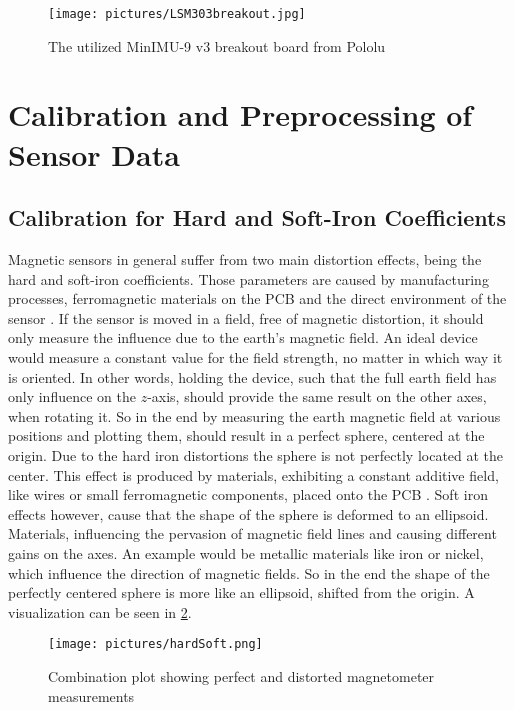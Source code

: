 \begin{figure}
\centering
\texttt{[image: pictures/LSM303breakout.jpg]}
\caption{The utilized MinIMU-9 v3 breakout board from Pololu \cite{pol2016}}
\label{fig:breakout}
\end{figure}


\section{Calibration and Preprocessing of Sensor Data} \label{sec:caliPrepro}

\subsection{Calibration for Hard and Soft-Iron Coefficients} \label{subsec:hardSoft}

Magnetic sensors in general suffer from two main distortion effects, being the hard and soft-iron coefficients. Those parameters are caused by manufacturing processes, ferromagnetic materials on the \ac{PCB} and the direct environment of the sensor \cite{ozyagcilar2012calibrating}. If the sensor is moved in a field, free of magnetic distortion, it should only measure the influence due to the earth's magnetic field. An ideal device would measure a constant value for the field strength, no matter in which way it is oriented. In other words, holding the device, such that the full earth field has only influence on the $ z $-axis, should provide the same result on the other axes, when rotating it. So in the end by measuring the earth magnetic field at various positions and plotting them, should result in a perfect sphere, centered at the origin. Due to the hard iron distortions the sphere is not perfectly located at the center. This effect is produced by materials, exhibiting a constant additive field, like wires or small ferromagnetic components, placed onto the PCB \cite{konv2009}. Soft iron effects however, cause that the shape of the sphere is deformed to an ellipsoid. Materials, influencing the pervasion of magnetic field lines and causing different gains on the axes. An example would be metallic materials like iron or nickel, which influence the direction of magnetic fields. So in the end the shape of the perfectly centered sphere is more like an ellipsoid, shifted from the origin. A visualization can be seen in \ref{fig:hardSoft}.

\begin{figure}
\centering
\texttt{[image: pictures/hardSoft.png]}
\caption{Combination plot showing perfect and distorted magnetometer measurements \cite{ozyagcilar2012calibrating}}
\label{fig:hardSoft}
\end{figure}

